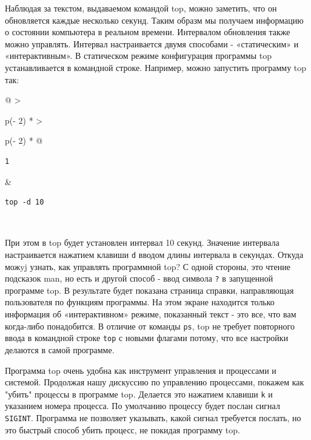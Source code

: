 \documentclass{report}
\begin{document}
Наблюдая за текстом, выдаваемом командой top, можно заметить, что он
обновляется каждые несколько секунд. Таким образм мы получаем информацию
о состоянии компьютера в реальном времени. Интервалом обновления также
можно управлять. Интервал настраивается двумя способами - «статическим»
и «интерактивным». В статическом режиме конфигурация программы top
устанавливается в командной строке. Например, можно запустить программу
top так:

\begin{longtable}[]{@{}
  >{\raggedright\arraybackslash}p{(\columnwidth - 2\tabcolsep) * }
  >{\raggedright\arraybackslash}p{(\columnwidth - 2\tabcolsep) * }@{}}
\toprule
\endhead
\begin{minipage}[t]{\linewidth}\raggedright
\begin{verbatim}
1
\end{verbatim}
\end{minipage} & \begin{minipage}[t]{\linewidth}\raggedright
\begin{verbatim}
top -d 10
\end{verbatim}
\end{minipage} \\ \addlinespace
\bottomrule
\end{longtable}

При этом в top будет установлен интервал 10 секунд. Значение интервала
настраивается нажатием клавиши \texttt{d} вводом длины интервала в
секундах. Откуда можyj узнать, как управлять программной top? С одной
стороны, это чтение подсказок man, но есть и другой способ - ввод
символа \texttt{?} в запущенной программе top. В результате будет
показана страница справки, направляющая пользователя по функциям
программы. На этом экране находится только информация об «интерактивном»
режиме, показанный текст - это все, что вам когда-либо понадобится. В
отличие от команды \texttt{ps}, top не требует повторного ввода в
командной строке \texttt{top} с новыми флагами потому, что все настройки
делаются в самой программе.

Программа top очень удобна как инструмент управления и процессами и
системой. Продолжая нашу дискуссию по управлению процессами, покажем как
"убить" процессы в программе top. Делается это нажатием клавиши
\texttt{k} и указанием номера процесса. По умолчанию процессу будет
послан сигнал \texttt{SIGINT}. Программа не позволяет указывать, какой
сигнал требуется послать, но это быстрый способ убить процесс, не
покидая программу top.
\end{document}
